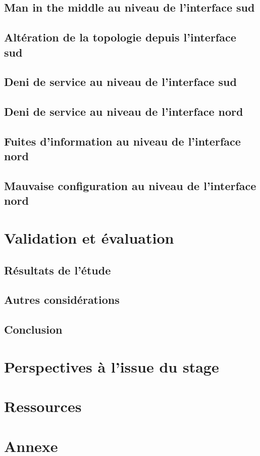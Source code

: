 \documentclass[11pt]{article}
\begin{document}
	\subsection{Man in the middle au niveau de l'interface sud}
		
		\newpage
	\subsection{Altération de la topologie depuis l'interface sud}
		
		\newpage
	\subsection{Deni de service au niveau de l'interface sud}
		
		\newpage
	\subsection{Deni de service au niveau de l'interface nord}
		
		\newpage
	\subsection{Fuites d'information au niveau de l'interface nord}
		
		\newpage
	\subsection{Mauvaise configuration au niveau de l'interface nord}
		
		\newpage
\section{Validation et évaluation}
	\subsection{Résultats de l'étude}
		
	\subsection{Autres considérations}
		
	\subsection{Conclusion}
		
\section{Perspectives à l'issue du stage}
\section{Ressources}
\newpage
{}
\section{Annexe}
	


~

\newpage


\end{document}

